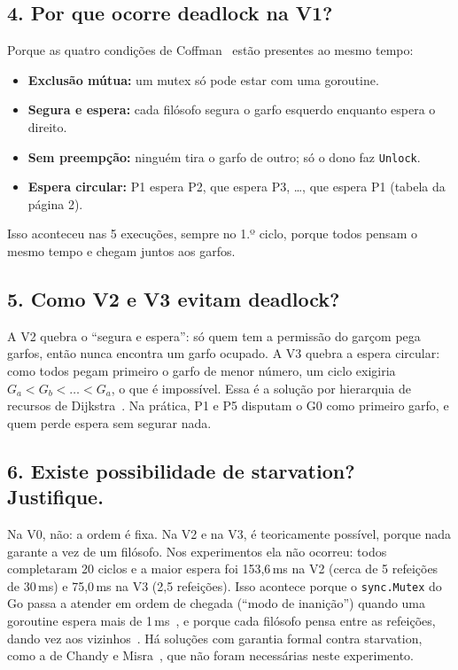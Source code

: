 \documentclass[11pt,a4paper]{article}
\begin{document}
\subsection*{4. Por que ocorre deadlock na V1?}
Porque as quatro condições de Coffman~\cite{coffman1971,tanenbaum2014,andrews1991,coxbuday2017} estão presentes ao mesmo tempo:
\begin{itemize}
  \item \textbf{Exclusão mútua:} um mutex só pode estar com uma goroutine.
  \item \textbf{Segura e espera:} cada filósofo segura o garfo esquerdo enquanto espera o direito.
  \item \textbf{Sem preempção:} ninguém tira o garfo de outro; só o dono faz \texttt{Unlock}.
  \item \textbf{Espera circular:} P1 espera P2, que espera P3, \ldots, que espera P1 (tabela da página 2).
\end{itemize}
Isso aconteceu nas 5 execuções, sempre no 1.º ciclo, porque todos pensam o mesmo tempo e
chegam juntos aos garfos.

\subsection*{5. Como V2 e V3 evitam deadlock?}
A V2 quebra o ``segura e espera'': só quem tem a permissão do garçom pega garfos, então nunca
encontra um garfo ocupado. A V3 quebra a espera circular: como todos pegam primeiro o garfo de
menor número, um ciclo exigiria $G_a < G_b < \dots < G_a$, o que é impossível. Essa é a solução por
hierarquia de recursos de Dijkstra~\cite{dijkstra1971,andrews1991}. Na prática, P1 e
P5 disputam o G0 como primeiro garfo, e quem perde espera sem segurar nada.

\subsection*{6. Existe possibilidade de starvation? Justifique.}
Na V0, não: a ordem é fixa. Na V2 e na V3, é teoricamente possível, porque nada garante a vez
de um filósofo. Nos experimentos ela não ocorreu: todos completaram 20 ciclos e a maior espera
foi 153,6\,ms na V2 (cerca de 5 refeições de 30\,ms) e 75,0\,ms na V3 (2,5 refeições). Isso acontece porque o
\texttt{sync.Mutex} do Go passa a atender em ordem de chegada (``modo de inanição'') quando uma
goroutine espera mais de 1\,ms~\cite{gomutexsrc}, e porque cada filósofo pensa entre as refeições,
dando vez aos vizinhos~\cite{coxbuday2017}. Há soluções com garantia formal contra starvation, como a de
Chandy e Misra~\cite{chandy1984}, que não foram necessárias neste experimento.
\end{document}
